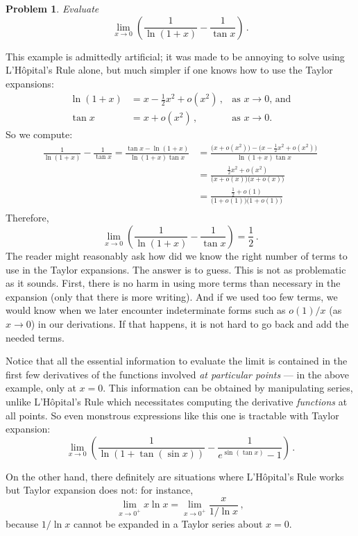 \documentclass[12pt]{article}
\newtheorem*{prob}{Problem}
\begin{document}
\begin{prob}
Evaluate 
\[
\lim_{x \to 0} \left( \frac{1}{\ln(1+ x)} - \frac{1}{\tan x} \right)\,.
\]
\end{prob}
This example is admittedly artificial; it was made to be annoying to solve using
L'H\^{o}pital's Rule alone, but much simpler if one knows how to use 
the Taylor expansions:
\begin{align*}
\ln(1+x) &= x - \frac{1}{2} x^2 + o(x^2)\,, &  \text{as $x \to 0$, and} \\
\tan x &= x + o(x^2)\,, & \text{as $x \to 0$.}
\end{align*}
So we compute:
\begin{align*}
\frac{1}{\ln (1 + x) } - \frac{1}{\tan x}
= \frac{\tan x - \ln(1 + x)}{ \ln (1 + x) \tan x} 
&= \frac{\bigl(x + o(x^2)\bigr) - \bigl( x - \frac{1}{2} x^2 + o(x^2) \bigr)}{ \ln(1+x) \tan x} \\
&= \frac{\frac{1}{2} x^2 + o(x^2)}{\bigl(x + o(x) \bigr) \bigl( x + o(x) \bigr) } \\
&= \frac{\frac{1}{2} + o(1)}{\bigl(1 + o(1) \bigr) \bigl(1+o(1) \bigr)} \\
\end{align*}
Therefore, 
\[
\lim_{x \to 0} \left( \frac{1}{\ln(1+ x)} - \frac{1}{\tan x} \right) = \frac{1}{2}\,.
\]
The reader might reasonably ask how
did we know the right number of terms to use in the Taylor expansions.
The answer is to guess.
This is not as problematic as it sounds.  First, there is no harm
in using more terms than necessary in the expansion (only that there is more writing).
And if we used too few terms, we would know when we later encounter indeterminate forms such as $o(1)/x$ (as $x \to 0$) in our derivations.  If that happens, 
it is not hard to go back and add the needed terms.

Notice that all the essential information to evaluate the limit is contained in the first few derivatives of 
the functions involved \emph{at particular points} --- in the  above example, 
only at $x = 0$.
This information can be obtained  by manipulating series, 
unlike L'H\^{o}pital's Rule
which necessitates computing the derivative \emph{functions} at all points.
So even monstrous expressions like this one is tractable
with Taylor expansion:
\[
\lim_{x \to 0} \left( \frac{1}{\ln(1+ \tan(\sin x))} - \frac{1}{e^{\sin(\tan x)}  -1 }\right)\,.
\]

On the other hand, there definitely are situations where 
L'H\^{o}pital's Rule works but Taylor expansion does not: for instance,
\[
\lim_{x \to 0^+} x \ln x = \lim_{x \to 0^+} \frac{x}{1/\ln x}\,,
\]
because $1/\ln x$ cannot be expanded in a Taylor series about $x =0 $.
\end{document}
